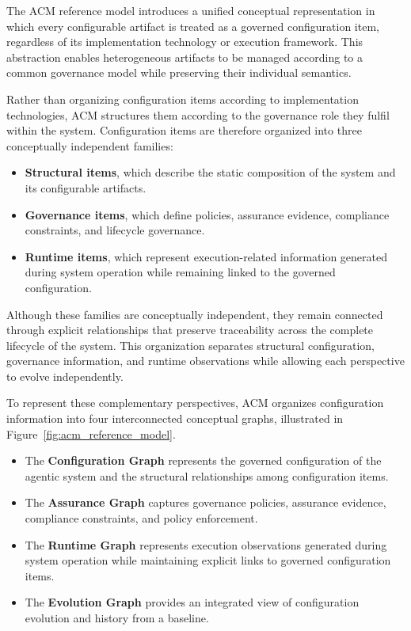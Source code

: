 \documentclass[10pt]{article}
\begin{document}
The ACM reference model introduces a unified conceptual representation in which every configurable artifact is treated as a governed configuration item, regardless of its implementation technology or execution framework. This abstraction enables heterogeneous artifacts to be managed according to a common governance model while preserving their individual semantics.

Rather than organizing configuration items according to implementation technologies, ACM structures them according to the governance role they fulfil within the system. Configuration items are therefore organized into three conceptually independent families:

\begin{itemize}

\item \textbf{Structural items}, which describe the static composition of the system and its configurable artifacts.

\item \textbf{Governance items}, which define policies, assurance evidence, compliance constraints, and lifecycle governance.

\item \textbf{Runtime items}, which represent execution-related information generated during system operation while remaining linked to the governed configuration.

\end{itemize}

Although these families are conceptually independent, they remain connected through explicit relationships that preserve traceability across the complete lifecycle of the system. This organization separates structural configuration, governance information, and runtime observations while allowing each perspective to evolve independently.

To represent these complementary perspectives, ACM organizes configuration information into four interconnected conceptual graphs, illustrated in Figure~\ref{fig:acm_reference_model}.

\begin{itemize}

\item The \textbf{Configuration Graph} represents the governed configuration of the agentic system and the structural relationships among configuration items.

\item The \textbf{Assurance Graph} captures governance policies, assurance evidence, compliance constraints, and policy enforcement.

\item The \textbf{Runtime Graph} represents execution observations generated during system operation while maintaining explicit links to governed configuration items.

\item The \textbf{Evolution Graph} provides an integrated view of configuration evolution and history from a baseline.

\end{itemize}
\end{document}
